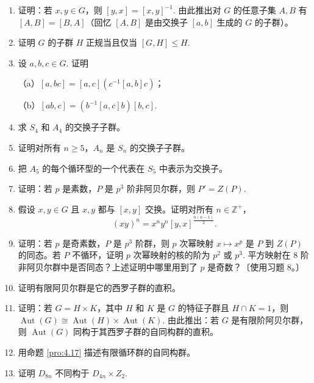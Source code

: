 \begin{enumerate}
\item 证明：若 \(x, y \in G\)，则 \([y, x] = [x, y]^{-1}\). 由此推出对 \(G\) 的任意子集 \(A, B\) 有 \([A, B] = [B, A]\)（回忆 \([A, B]\) 是由交换子 \([a, b]\) 生成的 \(G\) 的子群）。

\item 证明 \(G\) 的子群 \(H\) 正规当且仅当 \([G, H] \leq H\).

\item 设 \(a, b, c \in G\). 证明

（a）\([a, bc] = [a, c](c^{-1}[a, b]c)\)；

（b）\([ab, c] = (b^{-1}[a, c]b)[b, c]\).

\item 求 \(S_4\) 和 \(A_4\) 的交换子子群。

\item 证明对所有 \(n \geq 5\)，\(A_n\) 是 \(S_n\) 的交换子子群。

\item 把 \(A_5\) 的每个循环型的一个代表在 \(S_5\) 中表示为交换子。

\item 证明：若 \(p\) 是素数，\(P\) 是 \(p^3\) 阶非阿贝尔群，则 \(P' = Z(P)\).

\item 假设 \(x, y \in G\) 且 \(x, y\) 都与 \([x, y]\) 交换。证明对所有 \(n \in \mathbb{Z}^+\)，
\[
(xy)^n = x^n y^n [y, x]^{\frac{n(n-1)}{2}}.
\]

\item 证明：若 \(p\) 是奇素数，\(P\) 是 \(p^3\) 阶群，则 \(p\) 次幂映射 \(x \mapsto x^p\) 是 \(P\) 到 \(Z(P)\) 的同态。若 \(P\) 不循环，证明 \(p\) 次幂映射的核的阶为 \(p^2\) 或 \(p^3\). 平方映射在 8 阶非阿贝尔群中是否同态？上述证明中哪里用到了 \(p\) 是奇数？〔使用习题 8。〕

\item 证明有限阿贝尔群是它的西罗子群的直积。

\item 证明：若 \(G = H \times K\)，其中 \(H\) 和 \(K\) 是 \(G\) 的特征子群且 \(H \cap K = 1\)，则 \(\operatorname{Aut}(G) \cong \operatorname{Aut}(H) \times \operatorname{Aut}(K)\). 由此推出：若 \(G\) 是有限阶阿贝尔群，则 \(\operatorname{Aut}(G)\) 同构于其西罗子群的自同构群的直积。

\item 用命题 \ref{pro:4.17} 描述有限循环群的自同构群。

\item 证明 \(D_{8n}\) 不同构于 \(D_{4n} \times Z_2\).


\end{enumerate}
